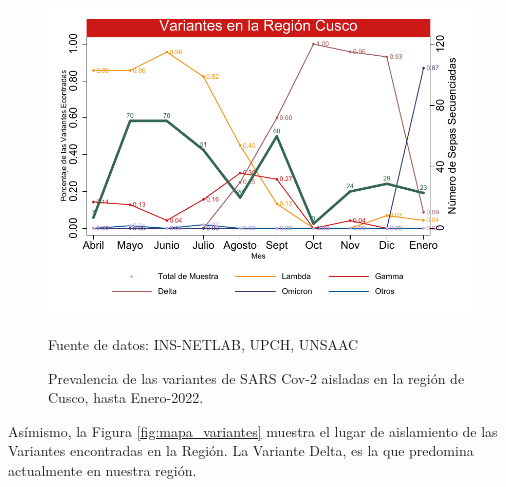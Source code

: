 \documentclass[12pt,a4paper,openany]{book}
\begin{document}
			
		\begin{figure}[h]
			\caption{Prevalencia de las variantes de SARS Cov-2 aisladas en la región de Cusco, hasta Enero-2022. }\label{fig:variantes}
			\begin{center}
				\includegraphics[width=0.85\linewidth]{../figuras/variantes.pdf}
			\end{center}
			{\footnotesize {Fuente de datos: INS-NETLAB, UPCH, UNSAAC}}
		\end{figure}
	
	
	Asímismo, la Figura \ref{fig:mapa_variantes}  muestra el lugar de aislamiento de las Variantes encontradas en la Región. La  Variante Delta, es la que predomina actualmente en nuestra región.
	
	
  
\end{document}
